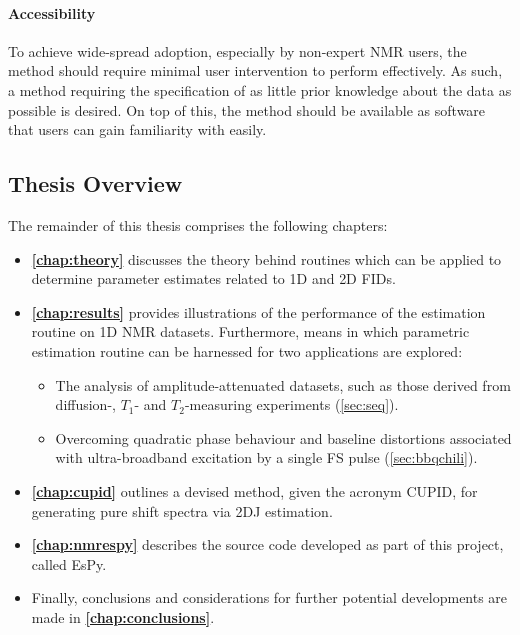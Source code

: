 \paragraph{Accessibility}
To achieve wide-spread adoption, especially by non-expert \ac{NMR} users,
the method should require minimal user intervention to perform effectively. As
such, a method requiring the specification of as little prior knowledge
about the data as possible is desired.
On top of this, the method should be available as software that users can gain
familiarity with easily.

\subsection{Thesis Overview}
The remainder of this thesis comprises the following chapters:
\begin{itemize}
    \item \textbf{\cref{chap:theory}} discusses the theory behind routines
        which can be applied to determine parameter estimates related to
        \ac{1D} and \ac{2D} \acp{FID}.
    \item \textbf{\cref{chap:results}} provides illustrations of the
        performance of the estimation routine on \ac{1D} \ac{NMR} datasets.
        Furthermore, means in which parametric estimation routine can be
        harnessed for two applications are explored:
        \begin{itemize}
            \item The analysis of amplitude-attenuated datasets, such as those
                derived from diffusion-, $T_1$- and $T_2$-measuring
                experiments (\cref{sec:seq}).
            \item Overcoming quadratic phase behaviour and baseline distortions
                associated with ultra-broadband excitation by a single
                \acl{FS} pulse (\cref{sec:bbqchili}).
        \end{itemize}
    \item \textbf{\cref{chap:cupid}} outlines a devised method, given the acronym
        \acs{CUPID}, for generating pure shift spectra via \ac{2DJ} estimation.
    \item \textbf{\cref{chap:nmrespy}} describes the source code developed as
        part of this project, called \ac{EsPy}.
    \item Finally, conclusions and considerations for further potential
        developments are made in \textbf{\cref{chap:conclusions}}.
\end{itemize}

